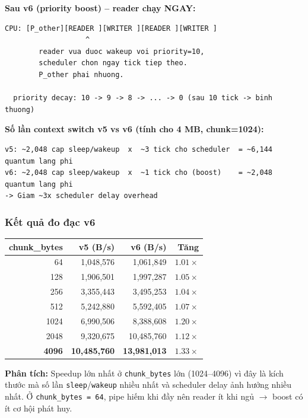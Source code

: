 \documentclass[11pt,a4paper]{article}
\begin{document}
\textbf{Sau v6 (priority boost) -- reader chạy NGAY:}

\begin{lstlisting}[style=plain]
  CPU: [P_other][READER ][WRITER ][READER ][WRITER ]
                   ^
        reader vua duoc wakeup voi priority=10,
        scheduler chon ngay tick tiep theo.
        P_other phai nhuong.

  priority decay: 10 -> 9 -> 8 -> ... -> 0 (sau 10 tick -> binh thuong)
\end{lstlisting}

\textbf{Số lần context switch v5 vs v6 (tính cho 4 MB, chunk=1024):}

\begin{lstlisting}[style=plain]
v5: ~2,048 cap sleep/wakeup  x  ~3 tick cho scheduler  = ~6,144 quantum lang phi
v6: ~2,048 cap sleep/wakeup  x  ~1 tick cho (boost)    = ~2,048 quantum lang phi
-> Giam ~3x scheduler delay overhead
\end{lstlisting}

\subsubsection{Kết quả đo đạc v6}

\begin{center}
\begin{tabular}{rrrr}
\toprule
\textbf{chunk\_bytes} & \textbf{v5 (B/s)} & \textbf{v6 (B/s)} & \textbf{Tăng} \\
\midrule
64   & 1{,}048{,}576  & 1{,}061{,}849  & $1.01\times$ \\
128  & 1{,}906{,}501  & 1{,}997{,}287  & $1.05\times$ \\
256  & 3{,}355{,}443  & 3{,}495{,}253  & $1.04\times$ \\
512  & 5{,}242{,}880  & 5{,}592{,}405  & $1.07\times$ \\
1024 & 6{,}990{,}506  & 8{,}388{,}608  & $1.20\times$ \\
2048 & 9{,}320{,}675  & 10{,}485{,}760 & $1.12\times$ \\
\textbf{4096} & \textbf{10{,}485{,}760} & \textbf{13{,}981{,}013} & $\mathbf{1.33\times}$ \\
\bottomrule
\end{tabular}
\end{center}

\textbf{Phân tích:} Speedup lớn nhất ở \texttt{chunk\_bytes} lớn (1024--4096) vì đây là kích thước mà số lần \texttt{sleep}/\texttt{wakeup} nhiều nhất và scheduler delay ảnh hưởng nhiều nhất. Ở \texttt{chunk\_bytes = 64}, pipe hiếm khi đầy nên reader ít khi ngủ $\rightarrow$ boost có ít cơ hội phát huy.
\end{document}
